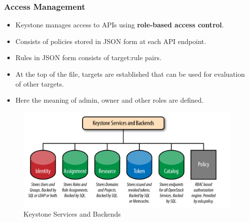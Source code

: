 \documentclass{article}
\begin{document}
\subsubsection{Access Management}
\begin{itemize}
    \item Keystone manages access to APIs using \textbf{role-based access control}.  
    
    \item Consists of policies stored in JSON form at each API endpoint. 
    
    \item Rules in JSON form consists of target:rule pairs. 
    
    \item At the top of the file, targets are established that can be used for evaluation of other targets. 
    
    \item Here the meaning of admin, owner and other roles are defined.
\end{itemize}
\begin{figure}[!ht]
    \centering
    \includegraphics[scale=0.5]{p3.png}
    \caption{Keystone Services and Backends}
    \label{fig:my_label_3}
\end{figure}
\end{document}
